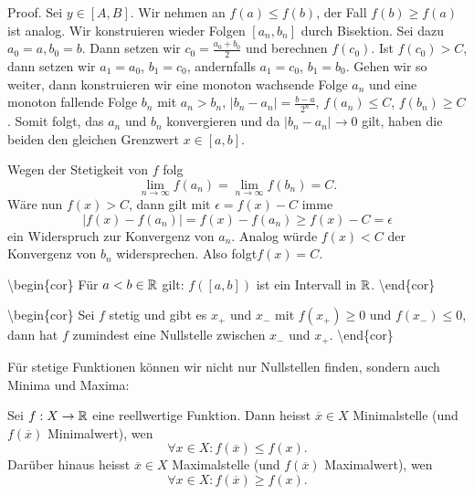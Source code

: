 \begin{emphBox}{}{}
Proof.  Sei \(y \in [A,B]\). Wir nehmen an \(f(a) \leq f(b)\), der Fall \(f(b) \geq f(a)\) ist analog. Wir konstruieren wieder Folgen \([a_n,b_n]\) durch Bisektion. Sei dazu \(a_0=a, b_0=b\). Dann setzen wir \(c_0 = \frac{a_0+b_0}2\) und berechnen \(f(c_0)\). Ist \(f(c_0) > C\), dann setzen wir \(a_1=a_0\), \(b_1=c_0\), andernfalls \(a_1=c_0\), \(b_1=b_0\). Gehen wir so weiter, dann konstruieren wir eine monoton wachsende Folge \(a_n\) und eine monoton fallende Folge \(b_n\) mit \(a_n > b_n\), \(|b_n-a_n|=\frac{b-a}{2^n}\), \(f(a_n) \leq C\), \(f(b_n) \geq C\). Somit folgt, das \(a_n\) und \(b_n\) konvergieren und da \(|b_n-a_n|\rightarrow 0\) gilt, haben die beiden den gleichen Grenzwert \(x \in [a,b]\).

Wegen der Stetigkeit von \(f\) folg
\begin{equation*}
 \lim_{n \rightarrow \infty} f(a_n) = \lim_{n \rightarrow \infty} f(b_n) = C.
\end{equation*}
Wäre nun \(f(x) > C\), dann gilt mit \(\epsilon = f(x) - C\) imme
\begin{equation*}
 |f(x) - f(a_n)| = f(x) - f(a_n) \geq f(x) - C = \epsilon
\end{equation*}
ein Widerspruch zur Konvergenz von \(a_n\). Analog würde \(f(x) < C\) der Konvergenz von \(b_n\) widersprechen. Also folgt\(f(x) = C\).
\end{emphBox}

\textbackslash{}begin\{cor\}
Für \(a <b \in \mathbb{R}\) gilt: \(f([a,b])\) ist ein Intervall in \(\mathbb{R}\).
\textbackslash{}end\{cor\}

\textbackslash{}begin\{cor\}
Sei \(f\) stetig und gibt es \(x_+\) und \(x_-\) mit \(f(x_+) \geq 0\) und \(f(x_-) \leq 0\), dann hat \(f\) zumindest eine Nullstelle zwischen \(x_-\) und \(x_+\).
\textbackslash{}end\{cor\}

Für stetige Funktionen können wir nicht nur Nullstellen finden, sondern auch Minima und Maxima:
\label{stetigkeit/eigenschaften:definition-1}
\begin{definition}{}{}



Sei \(f: X \rightarrow \mathbb{R}\) eine reellwertige Funktion. Dann heisst \(\overline{x} \in X\) Minimalstelle (und \(f(\overline{x})\) Minimalwert), wen
\begin{equation*}
 \forall x \in X: f(\overline{x}) \leq f(x).
\end{equation*}
Darüber hinaus heisst \(\overline{x} \in X\) Maximalstelle (und \(f(\overline{x})\) Maximalwert), wen
\begin{equation*}
 \forall x \in X: f(\overline{x}) \geq f(x).
\end{equation*}\end{definition}

